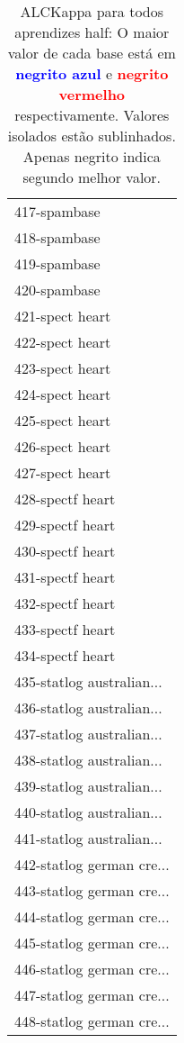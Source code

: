 \begin{table}[h]
\caption{ALCKappa para todos aprendizes half: O maior valor de cada base está em \textcolor{blue}{\textbf{negrito azul}} e \textcolor{red}{\textbf{negrito vermelho}} respectivamente. Valores isolados estão sublinhados. Apenas negrito indica segundo melhor valor.}
\begin{center}\begin{tabular}{l}
 & \\ \hline 417-spambase &  \\
418-spambase &  \\
419-spambase &  \\
420-spambase &  \\
421-spect heart &  \\
422-spect heart &  \\
423-spect heart &  \\ \hline
424-spect heart &  \\
425-spect heart &  \\
426-spect heart &  \\
427-spect heart &  \\
428-spectf heart &  \\
429-spectf heart &  \\
430-spectf heart &  \\ \hline
431-spectf heart &  \\
432-spectf heart &  \\
433-spectf heart &  \\
434-spectf heart &  \\
435-statlog australian... &  \\
436-statlog australian... &  \\
437-statlog australian... &  \\ \hline
438-statlog australian... &  \\
439-statlog australian... &  \\
440-statlog australian... &  \\
441-statlog australian... &  \\
442-statlog german cre... &  \\
443-statlog german cre... &  \\
444-statlog german cre... &  \\ \hline
445-statlog german cre... &  \\
446-statlog german cre... &  \\
447-statlog german cre... &  \\
448-statlog german cre... &  \\\end{tabular}\label{stratsALCKappa13AllReduxb}
\end{center}
\end{table}
